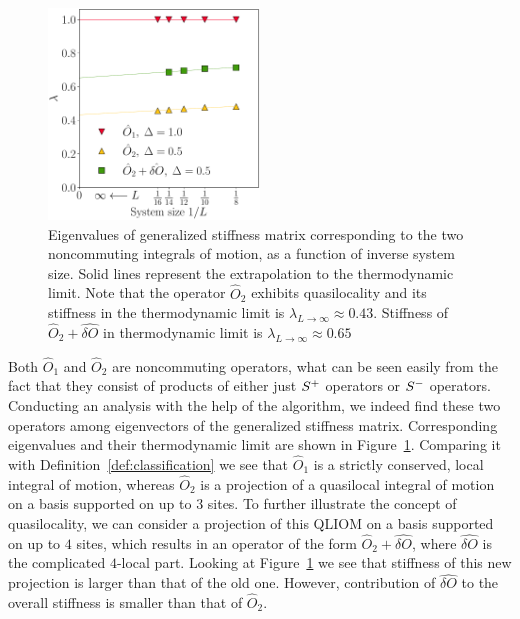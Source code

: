 \begin{figure}[htbp]
  \centering
  \includegraphics[width=0.5\textwidth]{Figures/nocomm_int.pdf}
  \caption{Eigenvalues of generalized stiffness matrix corresponding to the two noncommuting
    integrals of motion, as a function of inverse system size. Solid lines represent the extrapolation
    to the thermodynamic limit. Note that the operator \(\hat{O}_2\) exhibits quasilocality
    and its stiffness in the thermodynamic limit is \(\lambda_{L\to\infty} \approx
    0.43\). Stiffness of \(\hat{O}_2 + \hat{\delta O}\) in thermodynamic limit is
    \(\lambda_{L\to\infty} \approx 0.65\)}
  \label{fig: noncommuting integrable}
\end{figure}

Both \(\hat{O}_1\) and \(\hat{O}_2\) are noncommuting operators, what can be seen easily from the
fact that they consist of products of either just \(S^{+}\) operators or \(S^{-}\) operators. Conducting
an analysis with the help of the algorithm, we indeed find these two operators among eigenvectors
of the generalized stiffness matrix. Corresponding eigenvalues and their thermodynamic limit
are shown in Figure~\ref{fig: noncommuting integrable}. Comparing it with 
Definition~\ref{def:classification} we see that \(\hat{O}_1\) is a strictly 
conserved, local integral of motion, whereas \(\hat{O}_2\) is a projection 
of a quasilocal integral of motion on a basis supported on up to \(3\) sites.
To further illustrate the concept of quasilocality, we can consider a projection
of this QLIOM on a basis supported on up to \(4\) sites, which results in an operator of the form 
\(\hat{O}_2 + \hat{\delta O}\), where \(\hat{\delta O}\) is the complicated \(4\)-local part.
Looking at Figure~\ref{fig: noncommuting integrable} we see
that stiffness of this new projection is larger than that of the old one. However, contribution 
of \(\hat{\delta O}\) to the overall stiffness is smaller than that of \(\hat{O}_2\).

